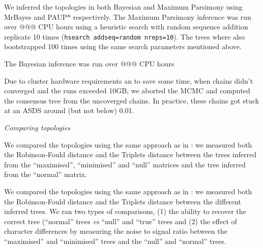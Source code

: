 \documentclass[12pt,letterpaper]{article}
\renewcommand{\subsection}[1]{%
\bigskip
\begin{center}
\begin{large}
\normalfont\itshape #1
\end{large}
\end{center}}
\begin{document}
We inferred the topologies in both Bayesian and Maximum Parsimony using MrBayes \citep[v3.2.6;][]{Ronquist2012mrbayes} and PAUP* \citep[v4.0a151;][]{swofford2001paup} respectively.
The Maximum Parsimony inference was run over @@@ CPU hours using a heuristic search with random sequence addition replicate 10 times (\texttt{hsearch addseq=random nreps=10}).
The trees where also bootstrapped 100 times using the same search parameters mentioned above.

The Bayesian inference was run over @@@ CPU hours






Due to cluster hardware requirements an to save some time, when chains didn't converged and the runs exceeded 10GB, we aborted the MCMC and computed the consensus tree from the uncoverged chains.
In practice, these chains got stuck at an ASDS around (but not below) 0.01.

\subsection{Comparing topologies}

We compared the topologies using the same approach as in \cite{Guillerme2016146}: we measured both the Robinson-Fould distance \citep{RF1981} and the Triplets distance \citep{dobson1975triplets} between the trees inferred from the ``maximised'', ``minimised'' and ``null'' matrices and the tree inferred from the ``normal'' matrix.

We compared the topologies using the same approach as in \cite{Guillerme2016146}: we measured both the Robinson-Fould distance \citep{RF1981} and the Triplets distance \citep{dobson1975triplets} between the different inferred trees.
We ran two types of comparisons, (1) the ability to recover the correct tree (``normal'' trees \textit{vs} ``null'' and ``true'' trees and (2) the effect of character differences by measuring the noise to signal ratio between the ``maximised'' and ``minimised'' trees and the ``null'' and ``normal'' trees.
\end{document}

